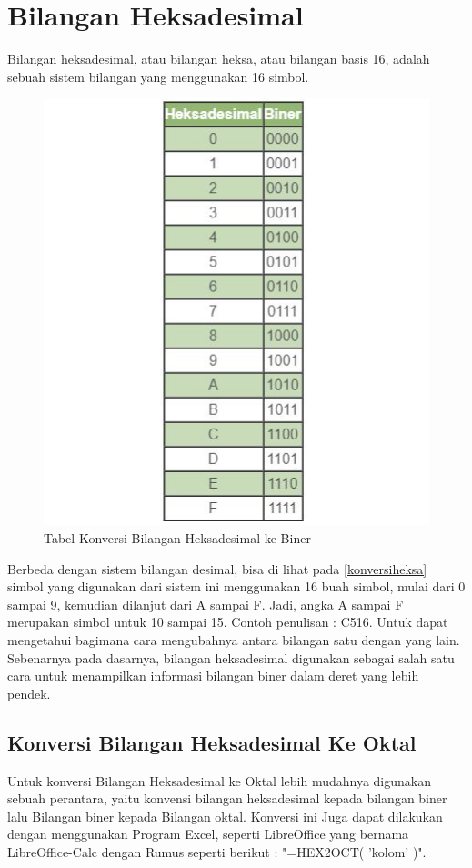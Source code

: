 {\section{Bilangan Heksadesimal}
Bilangan heksadesimal, atau bilangan heksa, atau bilangan basis 16, adalah sebuah sistem bilangan yang menggunakan 16 simbol.
\begin{figure}[ht]
\centerline{\includegraphics[width=1\textwidth]{figures/konversiheksa.JPG}}
\caption{Tabel Konversi Bilangan Heksadesimal ke Biner}
\label{Tabel Konversi}
\end{figure}
Berbeda dengan sistem bilangan desimal, bisa di lihat pada \ref{konversiheksa} simbol yang digunakan dari sistem ini menggunakan 16  buah simbol, mulai dari 0 sampai 9, kemudian dilanjut dari A sampai F. Jadi, angka A sampai F merupakan simbol untuk 10 sampai 15. Contoh penulisan : C516.
Untuk dapat mengetahui bagimana cara mengubahnya antara bilangan satu dengan yang lain. Sebenarnya pada dasarnya, bilangan heksadesimal digunakan sebagai salah satu cara untuk menampilkan informasi bilangan biner dalam deret yang lebih pendek.
\subsection{Konversi Bilangan Heksadesimal Ke Oktal}
Untuk konversi Bilangan Heksadesimal ke Oktal lebih mudahnya digunakan sebuah perantara, yaitu konvensi bilangan heksadesimal kepada bilangan biner lalu Bilangan biner kepada Bilangan oktal.
Konversi ini Juga dapat dilakukan dengan menggunakan Program Excel, seperti LibreOffice yang bernama LibreOffice-Calc dengan Rumus seperti berikut :  "=HEX2OCT( 'kolom' )".

}
